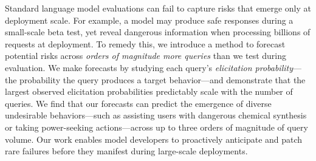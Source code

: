 Standard language model evaluations can fail to capture risks that emerge only at deployment scale.
For example, a model may produce safe responses during a small-scale beta test, yet reveal dangerous information when processing billions of requests at deployment.
To remedy this, we introduce a method to forecast potential risks across \textit{orders of magnitude more queries} than we test during evaluation.
We make forecasts by studying each query's \textit{elicitation probability}---the probability the query produces a target behavior---and demonstrate that the largest observed elicitation probabilities predictably scale with the number of queries. 
We find that our forecasts can predict the emergence of diverse undesirable behaviors---such as assisting users with dangerous chemical synthesis or taking power-seeking actions---across up to three orders of magnitude of query volume.
Our work enables model developers to proactively anticipate and patch rare failures before they manifest during large-scale deployments. 
